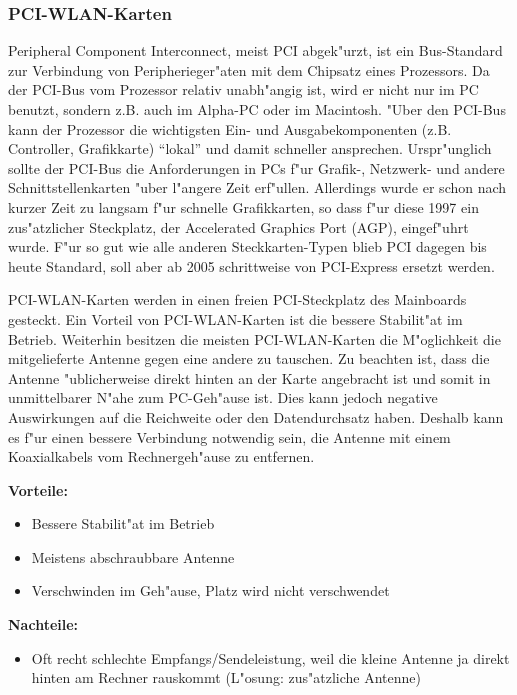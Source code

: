 \subsubsection{PCI-WLAN-Karten}

Peripheral Component Interconnect, meist PCI abgek"urzt, ist ein
Bus-Standard zur Verbindung von Peripherieger"aten mit dem Chipsatz
eines Prozessors. Da der PCI-Bus vom Prozessor relativ unabh"angig ist,
wird er nicht nur im PC benutzt, sondern z.B. auch im Alpha-PC oder
im Macintosh. "Uber den PCI-Bus kann der Prozessor die wichtigsten Ein-
und Ausgabekomponenten (z.B. Controller, Grafikkarte) "`lokal"' und damit
schneller ansprechen. Urspr"unglich sollte der PCI-Bus die Anforderungen in
PCs f"ur Grafik-, Netzwerk- und andere Schnittstellenkarten "uber l"angere
Zeit erf"ullen. Allerdings wurde er schon nach kurzer Zeit zu langsam f"ur
schnelle Grafikkarten, so dass f"ur diese 1997 ein zus"atzlicher Steckplatz,
der Accelerated Graphics Port (AGP), eingef"uhrt wurde. F"ur so gut wie
alle anderen Steckkarten-Typen blieb PCI dagegen bis heute Standard, soll
aber ab 2005 schrittweise von PCI-Express ersetzt werden.

PCI-WLAN-Karten werden in einen freien PCI-Steckplatz des Mainboards
gesteckt.
Ein Vorteil von PCI-WLAN-Karten ist die bessere Stabilit"at im
Betrieb. Weiterhin besitzen die meisten PCI-WLAN-Karten die M"oglichkeit
die mitgelieferte Antenne gegen eine andere zu tauschen. Zu beachten ist,
dass die Antenne "ublicherweise direkt hinten an der Karte angebracht
ist und somit in unmittelbarer N"ahe zum PC-Geh"ause ist. Dies kann
jedoch negative Auswirkungen auf die Reichweite oder den Datendurchsatz
haben. Deshalb kann es f"ur einen bessere Verbindung notwendig sein,
die Antenne mit einem Koaxialkabels vom Rechnergeh"ause zu entfernen.

\textbf{Vorteile:}

\begin{itemize}
	\item Bessere Stabilit"at im Betrieb
	\item Meistens abschraubbare Antenne
	\item Verschwinden im Geh"ause, Platz wird nicht verschwendet 
\end{itemize}

\textbf{Nachteile:}

\begin{itemize}
	\item Oft recht schlechte Empfangs/Sendeleistung, weil die kleine Antenne
				ja direkt hinten am Rechner rauskommt (L"osung: zus"atzliche Antenne)
\end{itemize}

